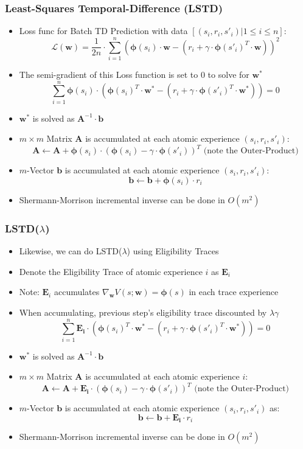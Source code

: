 \documentclass{beamer}
\begin{document}
\begin{frame}
\frametitle{Least-Squares Temporal-Difference (LSTD)}
\pause
\begin{itemize}[<+->]
\item Loss func for Batch TD Prediction with data $[(s_i, r_i, s'_i) | 1 \leq i \leq n]$:
$$\mathcal{L}(\bm{w}) = \frac 1 {2n} \cdot \sum_{i=1}^n (\bm{\phi}(s_i) \cdot \bm{w} - (r_i + \gamma \cdot \bm{\phi}(s'_i)^T \cdot \bm{w}))^2$$
\item The semi-gradient of this Loss function is set to 0 to solve for $\bm{w}^*$
$$\sum_{i=1}^n \bm{\phi}(s_i) \cdot (\bm{\phi}(s_i)^T \cdot \bm{w^*} - (r_i + \gamma \cdot \bm{\phi}(s'_i)^T \cdot \bm{w}^*)) = 0$$
\item $\bm{w}^*$ is solved as $\bm{A}^{-1} \cdot \bm{b}$
\item $m \times m$ Matrix $\bm{A}$ is accumulated at each atomic experience $(s_i, r_i, s'_i)$:
$$ \bm{A} \leftarrow \bm{A} + \bm{\phi}(s_i) \cdot (\bm{\phi}(s_i) - \gamma \cdot \bm{\phi}(s'_i))^T \text{ (note the Outer-Product)}$$
\item $m$-Vector $\bm{b}$ is accumulated at each atomic experience $(s_i, r_i, s'_i)$:
$$\bm{b} \leftarrow \bm{b} + \bm{\phi}(s_i) \cdot r_i$$
\item Shermann-Morrison incremental inverse can be done in $O(m^2)$
\end{itemize}
\end{frame}

\begin{frame}
\frametitle{LSTD($\lambda$)}
\pause
\begin{itemize}[<+->]
\item Likewise, we can do LSTD($\lambda$) using Eligibility Traces
\item Denote the Eligibility Trace of atomic experience $i$ as $\bm{E}_i$
\item Note: $\bm{E}_i$ accumulates $\nabla_{\bm{w}} V(s;\bm{w}) = \bm{\phi}(s)$ in each trace experience
\item When accumulating, previous step's eligibility trace discounted by $\lambda \gamma$
$$\sum_{i=1}^n \bm{E_i} \cdot (\bm{\phi}(s_i)^T \cdot \bm{w^*} - (r_i + \gamma \cdot \bm{\phi}(s'_i)^T \cdot \bm{w}^*)) = 0$$
\item $\bm{w}^*$ is solved as $\bm{A}^{-1} \cdot \bm{b}$
\item $m \times m$ Matrix $\bm{A}$ is accumulated at each atomic experience $i$:
$$ \bm{A} \leftarrow \bm{A} + \bm{E_i} \cdot (\bm{\phi}(s_i) - \gamma \cdot \bm{\phi}(s'_i))^T \text{ (note the Outer-Product)}$$
\item $m$-Vector $\bm{b}$ is accumulated at each atomic experience $(s_i, r_i, s'_i)$ as:
$$\bm{b} \leftarrow \bm{b} + \bm{E_i} \cdot r_i$$
\item Shermann-Morrison incremental inverse can be done in $O(m^2)$
\end{itemize}
\end{frame}
\end{document}
